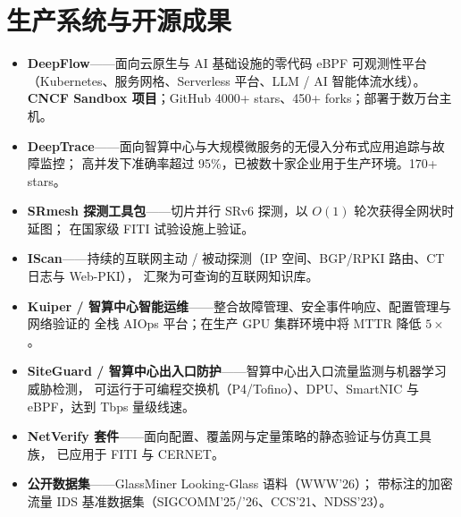 \documentclass[11pt]{article}
\begin{document}
\section{生产系统与开源成果}
\begin{itemize}
  \item \textbf{DeepFlow}——面向云原生与 AI 基础设施的零代码 eBPF 可观测性平台
        （Kubernetes、服务网格、Serverless 平台、LLM / AI 智能体流水线）。
        \textbf{CNCF Sandbox 项目}；GitHub 4000+ stars、450+ forks；部署于数万台主机。
  \item \textbf{DeepTrace}——面向智算中心与大规模微服务的无侵入分布式应用追踪与故障监控；
        高并发下准确率超过 95\%，已被数十家企业用于生产环境。170+ stars。
  \item \textbf{SRmesh 探测工具包}——切片并行 SRv6 探测，以 $O(1)$ 轮次获得全网状时延图；
        在国家级 FITI 试验设施上验证。
  \item \textbf{IScan}——持续的互联网主动 / 被动探测（IP 空间、BGP/RPKI 路由、CT 日志与 Web-PKI），
        汇聚为可查询的互联网知识库。
  \item \textbf{Kuiper / 智算中心智能运维}——整合故障管理、安全事件响应、配置管理与网络验证的
        全栈 AIOps 平台；在生产 GPU 集群环境中将 MTTR 降低 $5\times$。
  \item \textbf{SiteGuard / 智算中心出入口防护}——智算中心出入口流量监测与机器学习威胁检测，
        可运行于可编程交换机（P4/Tofino）、DPU、SmartNIC 与 eBPF，达到 Tbps 量级线速。
  \item \textbf{NetVerify 套件}——面向配置、覆盖网与定量策略的静态验证与仿真工具族，
        已应用于 FITI 与 CERNET。
  \item \textbf{公开数据集}——GlassMiner Looking-Glass 语料（WWW'26）；
        带标注的加密流量 IDS 基准数据集（SIGCOMM'25/'26、CCS'21、NDSS'23）。
\end{itemize}

\end{document}
